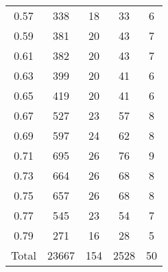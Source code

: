 \begin{table}[h!]
\begin{minipage}{\textwidth}
\begin{center}
\begin{tabular}{c|c|c|c|c}
0.57  & 338  & 18  & 33  & 6\\
0.59  & 381  & 20  & 43  & 7\\
0.61  & 382  & 20  & 43  & 7\\
0.63  & 399  & 20  & 41  & 6\\
0.65  & 419  & 20  & 41  & 6\\
0.67  & 527  & 23  & 57  & 8\\
0.69  & 597  & 24  & 62  & 8\\
0.71  & 695  & 26  & 76  & 9\\
0.73  & 664  & 26  & 68  & 8\\
0.75  & 657  & 26  & 68  & 8\\
0.77  & 545  & 23  & 54  & 7\\
0.79  & 271  & 16  & 28  & 5\\
\hline
Total  & 23667  & 154 & 2528 & 50 \\
\hline \hline
\end{tabular}


\end{center}
\end{minipage}
\end{table}